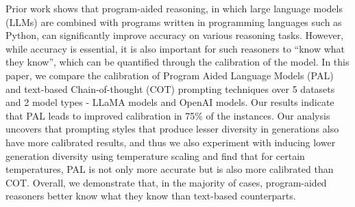 Prior work shows that program-aided reasoning, in which large language models (LLMs) are combined with programs written in programming languages such as Python, can significantly improve accuracy on various reasoning tasks. However, while accuracy is essential, it is also important for such reasoners to “know what they know”, which can be quantified through the calibration of the model. In this paper, we compare the calibration of Program Aided Language Models (PAL) and text-based Chain-of-thought (COT) prompting techniques over 5 datasets and 2 model types - LLaMA models and OpenAI models. Our results indicate that PAL leads to improved calibration in 75\% of the instances. Our analysis uncovers that prompting styles that produce lesser diversity in generations also have more calibrated results, and thus we also experiment with inducing lower generation diversity using temperature scaling and find that for certain temperatures, PAL is not only more accurate but is also more calibrated than COT. Overall, we demonstrate that, in the majority of cases, program-aided reasoners better know what they know than text-based counterparts.